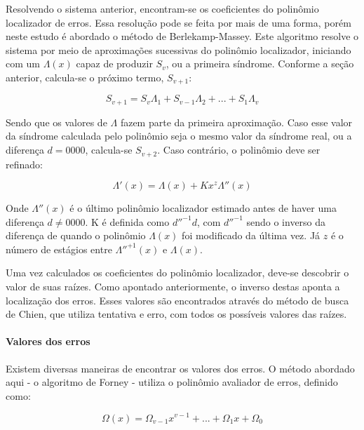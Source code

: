 	Resolvendo o sistema anterior, encontram-se os coeficientes do polinômio localizador de erros. Essa resolução pode se feita por mais de uma forma, porém neste estudo é abordado o método de Berlekamp-Massey. Este algoritmo resolve o sistema por meio de aproximações sucessivas do polinômio localizador, iniciando com um $\Lambda(x)$ capaz de produzir $S_{v}$, ou a primeira síndrome. Conforme a seção anterior, calcula-se o próximo termo, $S_{v + 1}$:
	
	\begin{equation}
	S_{v + 1} = S_{v}\Lambda_{1} + S_{v-1}\Lambda_{2} + ... + S_{1}\Lambda_{v}
	\end{equation}
	
	Sendo que os valores de $\Lambda$ fazem parte da primeira aproximação. Caso esse valor da síndrome calculada pelo polinômio seja o mesmo valor da síndrome real, ou a diferença $d = 0000$, calcula-se $S_{v + 2}$. Caso contrário, o polinômio deve ser refinado:
	
	\begin{equation}
	\Lambda'(x) = \Lambda(x) +  Kx^{z}\Lambda''(x)
	\end{equation}
	
	Onde $\Lambda''(x)$ é o último polinômio localizador estimado antes de haver uma diferença $d \neq 0000$. K é definida como $d''^{-1}d$, com $d''^{-1}$ sendo o inverso da diferença de quando o polinômio $\Lambda(x)$ foi modificado da última vez. Já $z$ é o número de estágios entre $\Lambda''^{+1}(x)$ e $\Lambda(x)$.
	
	Uma vez calculados os coeficientes do polinômio localizador, 
	deve-se descobrir o valor de suas raízes. Como apontado anteriormente, o inverso destas aponta a localização dos erros. Esses valores são encontrados através do método de busca de Chien, que utiliza tentativa e erro, com todos os possíveis valores das raízes.
	
	\paragraph{Valores dos erros}
	
	Existem diversas maneiras de encontrar os valores dos erros. O método abordado aqui - o algoritmo de Forney - utiliza o polinômio avaliador de erros, definido como:
	
	\begin{equation}
	\Omega(x) = \Omega_{v-1}x^{v-1} + ... + \Omega_{1}x + \Omega_{0}
	\end{equation}
	
